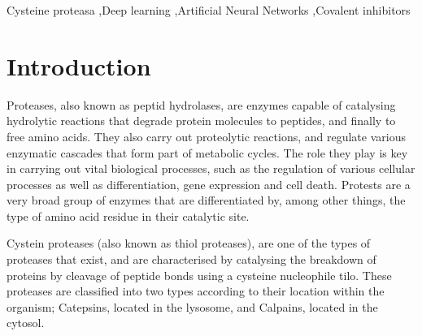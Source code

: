 \documentclass[final,times,twocolumn,article]{elsarticle}
\begin{document}
\begin{frontmatter}
\begin{abstract}
\end{abstract}



\begin{keyword}
Cysteine proteasa \sep Deep learning \sep Artificial Neural Networks \sep Covalent inhibitors



\end{keyword}


\end{frontmatter}




\section{Introduction}

Proteases, also known as peptid hydrolases, are enzymes capable of catalysing hydrolytic reactions that degrade protein molecules to peptides, and finally to free amino acids. They also carry out proteolytic reactions, and regulate various enzymatic cascades that form part of metabolic cycles. \cite{Ramos2019} The role they play is key in carrying out vital biological processes, such as the regulation of various cellular processes as well as differentiation, gene expression and cell death. Protests are a very broad group of enzymes that are differentiated by, among other things, the type of amino acid residue in their catalytic site. \cite{Ramos2019}

Cystein proteases (also known as thiol proteases), are one of the types of proteases that exist, and are characterised by catalysing the breakdown of proteins by cleavage of peptide bonds using a cysteine nucleophile tilo. These proteases are classified into two types according to their location within the organism; Catepsins, located in the lysosome, and Calpains, located in the cytosol. \cite{Gupta2020}
\end{document}
